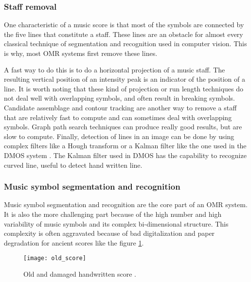 \documentclass[11pt]{sdm}
\begin{document}
\subsubsection{Staff removal}

One characteristic of a music score is that most of the symbols are connected by the five lines that constitute a staff.
These lines are an obstacle for almost every classical technique of segmentation and recognition used in computer vision.
This is why, most OMR systems first remove these lines.

A fast way to do this is to do a horizontal projection of a music staff.
The resulting vertical position of an intensity peak is an indicator of the position of a line.
It is worth noting that these kind of projection or run length techniques do not deal well with overlapping symbols, and often result in breaking symbols.
Candidate assemblage and contour tracking are another way to remove a staff that are relatively fast to compute and can sometimes deal with overlapping symbols.
Graph path search techniques can produce really good results, but are slow to compute.
Finally, detection of lines in an image can be done by using complex filters like a Hough transform or a Kalman filter like the one used in the DMOS system \cite{couasnon_dmos_2001}.
The Kalman filter used in DMOS has the capability to recognize curved line, useful to detect hand written line.

\subsubsection{Music symbol segmentation and recognition}

Music symbol segmentation and recognition are the core part of an OMR system.
It is also the more challenging part because of the high number and high variability of music symbols and its complex bi-dimensional structure.
This complexity is often aggravated because of bad digitalization and paper degradation for ancient scores like the figure \ref{old_score}.
\begin{figure}[btp]
  \texttt{[image: old\_score]}
  \caption{\label{old_score} Old and damaged handwritten score \cite{fornes_analysis_2014}. }
\end{figure}
\end{document}
